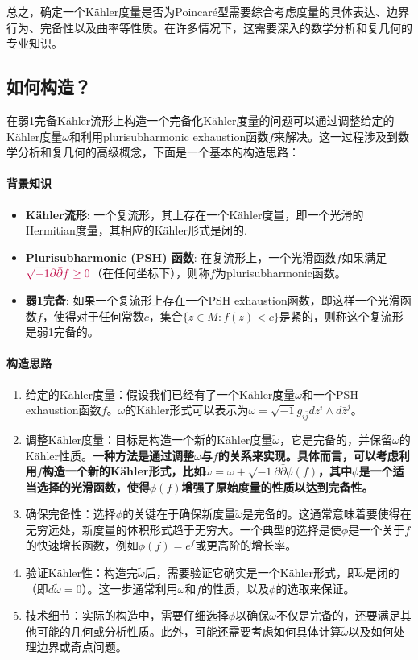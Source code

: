 \documentclass[lang=cn,zihao=-4,a4paper,fontset=none]{beautybook}
\begin{document}
总之，确定一个Kähler度量是否为Poincaré型需要综合考虑度量的具体表达、边界行为、完备性以及曲率等性质。在许多情况下，这需要深入的数学分析和复几何的专业知识。

\subsection{如何构造？}
在弱1完备Kähler流形上构造一个完备化Kähler度量的问题可以通过调整给定的Kähler度量$\omega$和利用plurisubharmonic exhaustion函数$f$来解决。这一过程涉及到数学分析和复几何的高级概念，下面是一个基本的构造思路：
\paragraph{背景知识}
\begin{itemize}
    \item \textbf{Kähler流形}: 一个复流形，其上存在一个Kähler度量，即一个光滑的Hermitian度量，其相应的Kähler形式是闭的.
    \item \textbf{Plurisubharmonic (PSH) 函数}: 在复流形上，一个光滑函数$f$如果满足$\color{purple}\sqrt{-1}\partial\bar{\partial}f \geq 0$（在任何坐标下），则称$f$为plurisubharmonic函数。
    \item \textbf{弱1完备}: 如果一个复流形上存在一个PSH exhaustion函数，即这样一个光滑函数$f$，使得对于任何常数$c$，集合$\{z \in M : f(z) < c\}$是紧的，则称这个复流形是弱1完备的。
\end{itemize}
\paragraph{构造思路}
\begin{enumerate}
    \item 给定的Kähler度量：假设我们已经有了一个Kähler度量$\omega$和一个PSH exhaustion函数$f$。$\omega$的Kähler形式可以表示为$\omega = \sqrt{-1}g_{i\bar{j}}dz^i \wedge d\bar{z}^j$。
    \item 调整Kähler度量：目标是构造一个新的Kähler度量$\tilde{\omega}$，它是完备的，并保留$\omega$的Kähler性质。\textbf{一种方法是通过调整$\omega$与$f$的关系来实现。具体而言，可以考虑利用$f$构造一个新的Kähler形式，比如$\tilde{\omega} = \omega + \sqrt{-1}\partial\bar{\partial}\phi(f)$，其中$\phi$是一个适当选择的光滑函数，使得$\phi(f)$增强了原始度量的性质以达到完备性。}
    \item 确保完备性：选择$\phi$的关键在于确保新度量$\tilde{\omega}$是完备的。这通常意味着要使得在无穷远处，新度量的体积形式趋于无穷大。一个典型的选择是使$\phi$是一个关于$f$的快速增长函数，例如$\phi(f) = e^f$或更高阶的增长率。
    \item 验证Kähler性：构造完$\tilde{\omega}$后，需要验证它确实是一个Kähler形式，即$\tilde{\omega}$是闭的（即$d\tilde{\omega} = 0$）。这一步通常利用$\omega$和$f$的性质，以及$\phi$的选取来保证。
    \item 技术细节：实际的构造中，需要仔细选择$\phi$以确保$\tilde{\omega}$不仅是完备的，还要满足其他可能的几何或分析性质。此外，可能还需要考虑如何具体计算$\tilde{\omega}$以及如何处理边界或奇点问题。
\end{enumerate}
\end{document}
